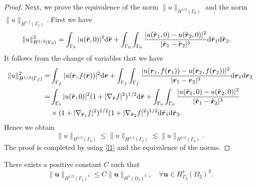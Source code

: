 \documentclass[final,leqno]{siamltex}
\begin{document}
\begin{proof}
Next, we prove the equivalence of the norm $\|u\|_{H^{1/2} (\Gamma_0)}$ and
the norm $\|u\|_{H^{1/2}(\Gamma_f)}$. First we have
\begin{align*}
 \| u\|^2_{H^{1/2} (\Gamma_0)}
 &= \int_{\Gamma_0} | u (\tilde{\boldsymbol r}, 0)|^2 {\rm d
}\tilde{\boldsymbol r}+\int_{\Gamma_0}\int_{\Gamma_0} \frac{ |u
(\tilde{\boldsymbol r}_1, 0) - u(\tilde{\boldsymbol r}_2,
0)|^2}{|\tilde{\boldsymbol r}_1 - \tilde{\boldsymbol
r}_2|^3}{\rm d}\tilde{\boldsymbol r}_1 {\rm d} \tilde{\boldsymbol r}_2.
\end{align*}
It follows from the change of variables that we have
\begin{align*}
\|u\|^2_{H^{1/2} (\Gamma_f)}=&
\int_{\Gamma_f} |u (\boldsymbol r, f (\boldsymbol r))|^2 {\rm d}\boldsymbol
r+\int_{\Gamma_f}\int_{\Gamma_f} \frac{ |u (\boldsymbol r_1, f (\boldsymbol
r_1)) - u(\boldsymbol r_2, f (\boldsymbol r_2))|^2}{|\boldsymbol r_1
- \boldsymbol r_2|^3}{\rm d} \boldsymbol r_1 {\rm d} \boldsymbol r_2\\
=&\int_{\Gamma_0}|u(\tilde{\boldsymbol r}, 0)|^2
(1+|\nabla_{\tilde{\boldsymbol r}} f|^2)^{1/2}{\rm
d}\tilde{\boldsymbol r}+\int_{\Gamma_0}\int_{\Gamma_0} \frac{ |u
(\tilde{\boldsymbol r}_1, 0) - u(\tilde{\boldsymbol r}_2,
0)|^2}{|\tilde{\boldsymbol r}_1 - \tilde{\boldsymbol
r}_2|^3}\\
&\times(1+|\nabla_{\tilde{\boldsymbol r}_1}f|^2)^{1/2}
(1+|\nabla_{\tilde{\boldsymbol r}_2}f|^2)^{1/2}
{\rm d}\tilde{\boldsymbol r}_1 {\rm d} \tilde{\boldsymbol r}_2.
\end{align*}
Hence we obtain
\[
 \|u\|_{H^{1/2}(\Gamma_0)}\leq \|u\|_{H^{1/2}(\Gamma_f)}\lesssim
\|u\|_{H^{1/2}(\Gamma_0)}.
\]
The proof is completed by using \eqref{l1} and the equivalence of the norms.
\end{proof}

\begin{lemma}\label{trg}
There exists a positive constant $C$ such that
\[
\|\boldsymbol u\|_{H^{1/2} (\Gamma_f)^3} \leq C\|\boldsymbol u\|_{H^1
(\Omega_2)^3}, \quad  \forall \boldsymbol u \in H^1_{\Gamma_g}(\Omega_2)^3.
\]
\end{lemma}
\end{document}
